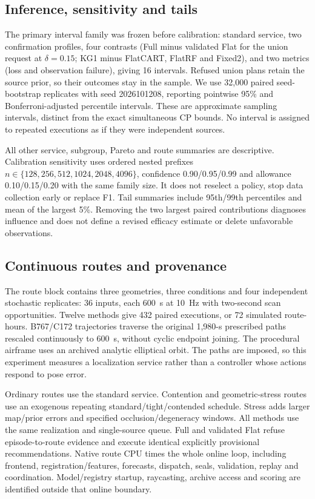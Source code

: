 \subsection{Inference, sensitivity and tails}
The primary interval family was frozen before calibration: standard service, two confirmation profiles, four contrasts (Full minus validated Flat for the union request at $\delta=0.15$; KG1 minus FlatCART, FlatRF and Fixed2), and two metrics (loss and observation failure), giving 16 intervals. Refused union plans retain the source prior, so their outcomes stay in the sample. We use 32,000 paired seed-bootstrap replicates with seed 2026101208, reporting pointwise 95\% and Bonferroni-adjusted percentile intervals. These are approximate sampling intervals, distinct from the exact simultaneous CP bounds. No interval is assigned to repeated executions as if they were independent sources.

All other service, subgroup, Pareto and route summaries are descriptive. Calibration sensitivity uses ordered nested prefixes $n\in\{128,256,512,1024,2048,4096\}$, confidence 0.90/0.95/0.99 and allowance 0.10/0.15/0.20 with the same family size. It does not reselect a policy, stop data collection early or replace F1. Tail summaries include 95th/99th percentiles and mean of the largest 5\%. Removing the two largest paired contributions diagnoses influence and does not define a revised efficacy estimate or delete unfavorable observations.

\subsection{Continuous routes and provenance}
The route block contains three geometries, three conditions and four independent stochastic replicates: 36 inputs, each 600~s at 10~Hz with two-second scan opportunities. Twelve methods give 432 paired executions, or 72 simulated route-hours. B767/C172 trajectories traverse the original 1,980-s prescribed paths rescaled continuously to 600~s, without cyclic endpoint joining. The procedural airframe uses an archived analytic elliptical orbit. The paths are imposed, so this experiment measures a localization service rather than a controller whose actions respond to pose error.

Ordinary routes use the standard service. Contention and geometric-stress routes use an exogenous repeating standard/tight/contended schedule. Stress adds larger map/prior errors and specified occlusion/degeneracy windows. All methods use the same realization and single-source queue. Full and validated Flat refuse episode-to-route evidence and execute identical explicitly provisional recommendations. Native route CPU times the whole online loop, including frontend, registration/features, forecasts, dispatch, seals, validation, replay and coordination. Model/registry startup, raycasting, archive access and scoring are identified outside that online boundary.

